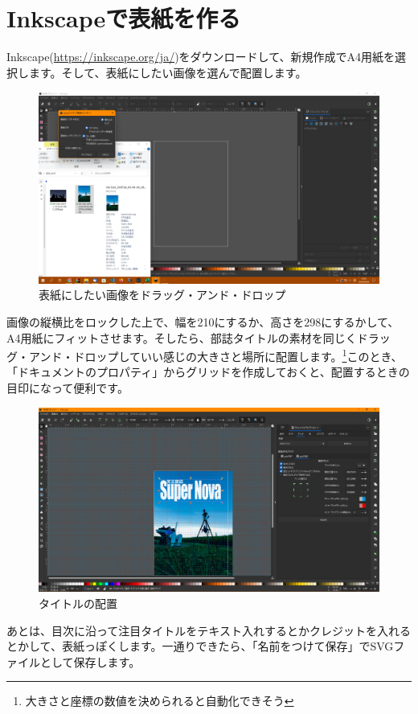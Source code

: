 \documentclass[../super_nova_20yy]{subfiles}
\begin{document}
\section{Inkscapeで表紙を作る}
Inkscape(\url{https://inkscape.org/ja/})をダウンロードして、新規作成でA4用紙を選択します。そして、表紙にしたい画像を選んで配置します。
\begin{figure}[H]
  \centering
  \includegraphics[width=.5\textwidth]{figures/ss265.png}
  \caption{表紙にしたい画像をドラッグ・アンド・ドロップ}
  \label{fig:ss265}
\end{figure}
画像の縦横比をロックした上で、幅を210にするか、高さを298にするかして、A4用紙にフィットさせます。そしたら、部誌タイトルの素材を同じくドラッグ・アンド・ドロップしていい感じの大きさと場所に配置します。\footnote{大きさと座標の数値を決められると自動化できそう}このとき、「ドキュメントのプロパティ」からグリッドを作成しておくと、配置するときの目印になって便利です。
\begin{figure}[H]
  \centering
  \includegraphics[width=.5\textwidth]{figures/ss267.png}
  \caption{タイトルの配置}
  \label{fig:ss267}
\end{figure}
あとは、目次に沿って注目タイトルをテキスト入れするとかクレジットを入れるとかして、表紙っぽくします。一通りできたら、「名前をつけて保存」でSVGファイルとして保存します。
\end{document}
